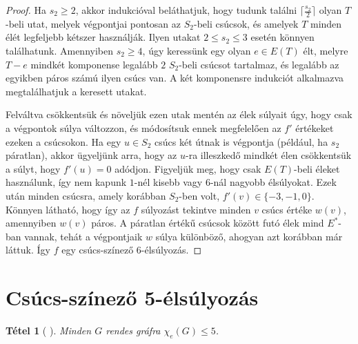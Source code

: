 \documentclass[12pt, a4paper]{report}
\newtheorem{tét}{Tétel}[section]
\theoremstyle{remark}
\theoremstyle{definition}
\begin{document}
\begin{proof}
Ha $s_2 \geq 2$, akkor indukcióval beláthatjuk, hogy tudunk találni $\lceil \frac{s_2}{2} \rceil$ olyan $T$-beli utat, melyek végpontjai pontosan az $S_2$-beli csúcsok, és amelyek $T$ minden élét legfeljebb kétszer használják. Ilyen utakat $2 \leq s_2 \leq 3$ esetén könnyen találhatunk. Amennyiben $s_2 \geq 4$, úgy keressünk egy olyan $e \in E(T)$ élt, melyre $T-e$ mindkét komponense legalább $2$ $S_2$-beli csúcsot tartalmaz, és legalább az egyikben páros számú ilyen csúcs van. A két komponensre indukciót alkalmazva megtalálhatjuk a keresett utakat.

Felváltva csökkentsük és növeljük ezen utak mentén az élek súlyait úgy, hogy csak a végpontok súlya változzon, és módosítsuk ennek megfelelően az $f'$ értékeket ezeken a csúcsokon. Ha egy $u \in S_2$ csúcs két útnak is végpontja (például, ha $s_2$ páratlan), akkor ügyeljünk arra, hogy az $u$-ra illeszkedő mindkét élen csökkentsük a súlyt, hogy $f'(u) = 0$ adódjon. Figyeljük meg, hogy csak $E(T)$-beli éleket használunk, így nem kapunk $1$-nél kisebb vagy $6$-nál nagyobb élsúlyokat. Ezek után minden csúcsra, amely korábban $S_2$-ben volt, $f'(v) \in \lbrace -3, -1, 0 \rbrace$. Könnyen látható, hogy így az $f$ súlyozást tekintve minden $v$ csúcs értéke $w(v)$, amennyiben $w(v)$ páros. A páratlan értékű csúcsok között futó élek mind $E^*$-ban vannak, tehát a végpontjaik $w$ súlya különböző, ahogyan azt korábban már láttuk. Így $f$ egy csúcs-színező $6$-élsúlyozás.
\end{proof}

\section{Csúcs-színező 5-élsúlyozás}
\begin{tét}[\citeauthor{Kalkowski2010} \cite{Kalkowski2010}]
Minden $G$ rendes gráfra $\chi_e(G) \leq 5$.
\end{tét}
\end{document}
